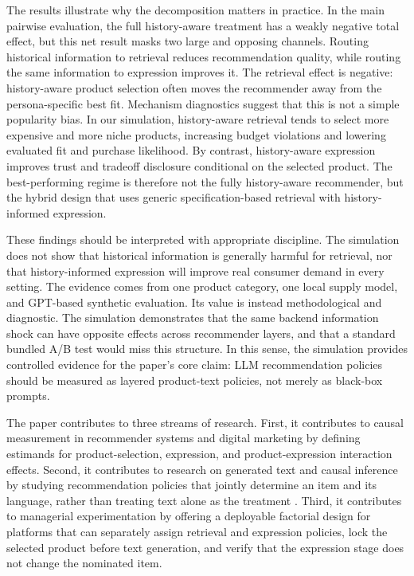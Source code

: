 \documentclass[11pt]{article}
\begin{document}
The results illustrate why the decomposition matters in practice. In the main pairwise evaluation, the full history-aware treatment has a weakly negative total effect, but this net result masks two large and opposing channels. Routing historical information to retrieval reduces recommendation quality, while routing the same information to expression improves it. The retrieval effect is negative: history-aware product selection often moves the recommender away from the persona-specific best fit. Mechanism diagnostics suggest that this is not a simple popularity bias. In our simulation, history-aware retrieval tends to select more expensive and more niche products, increasing budget violations and lowering evaluated fit and purchase likelihood. By contrast, history-aware expression improves trust and tradeoff disclosure conditional on the selected product. The best-performing regime is therefore not the fully history-aware recommender, but the hybrid design that uses generic specification-based retrieval with history-informed expression.

These findings should be interpreted with appropriate discipline. The simulation does not show that historical information is generally harmful for retrieval, nor that history-informed expression will improve real consumer demand in every setting. The evidence comes from one product category, one local supply model, and GPT-based synthetic evaluation. Its value is instead methodological and diagnostic. The simulation demonstrates that the same backend information shock can have opposite effects across recommender layers, and that a standard bundled A/B test would miss this structure. In this sense, the simulation provides controlled evidence for the paper's core claim: LLM recommendation policies should be measured as layered product-text policies, not merely as black-box prompts.

The paper contributes to three streams of research. First, it contributes to causal measurement in recommender systems and digital marketing by defining estimands for product-selection, expression, and product-expression interaction effects. Second, it contributes to research on generated text and causal inference by studying recommendation policies that jointly determine an item and its language, rather than treating text alone as the treatment \citep{egami2019causal, feldman2026latent}. Third, it contributes to managerial experimentation by offering a deployable factorial design for platforms that can separately assign retrieval and expression policies, lock the selected product before text generation, and verify that the expression stage does not change the nominated item.
\end{document}
